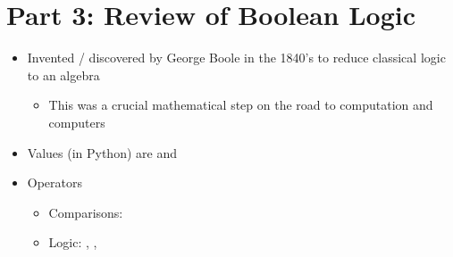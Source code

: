\documentclass[letterpaper,10pt,english]{sphinxmanual}
\begin{document}
\section{Part 3:  Review of Boolean Logic}
\label{\detokenize{lecture_notes/lec11_conditionals2:part-3-review-of-boolean-logic}}\begin{itemize}
\item {} 
Invented / discovered by George Boole in the 1840’s to reduce
classical logic to an algebra
\begin{itemize}
\item {} 
This was a crucial mathematical step on the road to computation
and computers

\end{itemize}

\item {} 
Values (in Python) are  and 

\item {} 
Operators
\begin{itemize}
\item {} 
Comparisons: \sphinxcode{\sphinxupquote{\textless{}, \textgreater{}, \textless{}=, \textgreater{}=, == !=}}

\item {} 
Logic: , , 

\end{itemize}

\end{itemize}
\end{document}
